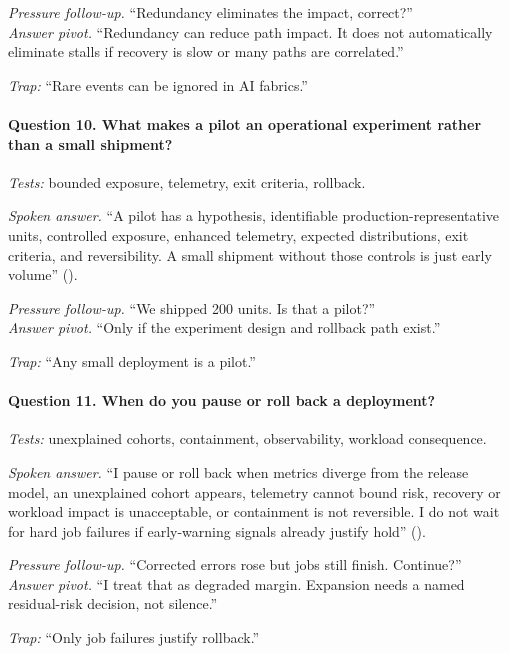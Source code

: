 \textit{Pressure follow-up.} ``Redundancy eliminates the impact, correct?''\\
\textit{Answer pivot.} ``Redundancy can reduce path impact. It does not
automatically eliminate stalls if recovery is slow or many paths are
correlated.''

\textit{Trap:} ``Rare events can be ignored in AI fabrics.''

\paragraph{Question 10. What makes a pilot an operational experiment rather
than a small shipment?}
\textit{Tests:} bounded exposure, telemetry, exit criteria, rollback.

\textit{Spoken answer.}
``A pilot has a hypothesis, identifiable production-representative units,
controlled exposure, enhanced telemetry, expected distributions, exit criteria,
and reversibility. A small shipment without those controls is just early
volume'' ().

\textit{Pressure follow-up.} ``We shipped 200 units. Is that a pilot?''\\
\textit{Answer pivot.} ``Only if the experiment design and rollback path exist.''

\textit{Trap:} ``Any small deployment is a pilot.''

\paragraph{Question 11. When do you pause or roll back a deployment?}
\textit{Tests:} unexplained cohorts, containment, observability, workload
consequence.

\textit{Spoken answer.}
``I pause or roll back when metrics diverge from the release model, an
unexplained cohort appears, telemetry cannot bound risk, recovery or workload
impact is unacceptable, or containment is not reversible. I do not wait for
hard job failures if early-warning signals already justify hold''
().

\textit{Pressure follow-up.} ``Corrected errors rose but jobs still finish.
Continue?''\\
\textit{Answer pivot.} ``I treat that as degraded margin. Expansion needs a
named residual-risk decision, not silence.''

\textit{Trap:} ``Only job failures justify rollback.''

